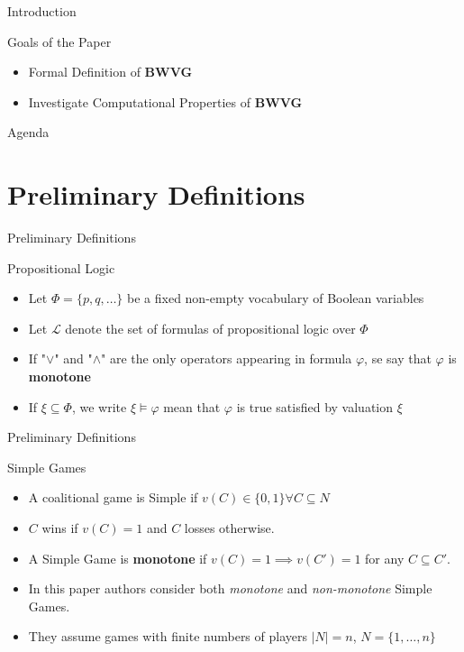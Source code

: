\documentclass{beamer}
\begin{document}
\begin{frame}[fragile]{Introduction}
  \begin{block}{Goals of the Paper}
    \begin{itemize}
      \item Formal Definition of \textbf{BWVG}
      \item Investigate Computational Properties of \textbf{BWVG}
    \end{itemize}
  \end{block}
\end{frame}

\begin{frame}[fragile]{Agenda}
  \section{Preliminary Definitions}
  \tableofcontents[currentsection]
\end{frame}

\begin{frame}[fragile]{Preliminary Definitions}
  \begin{block}{Propositional Logic}
    \begin{itemize}
      \item Let $\Phi = \{p,q,\dots\}$ be a fixed non-empty vocabulary of Boolean variables    
      \item Let $\mathcal{L}$ denote the set of formulas of propositional logic over $\Phi$
      \item If "$\lor$" and "$\land$" are the only operators appearing in formula $\varphi$, se say that $\varphi$ is \textbf{monotone}
      \item If $\xi \subseteq \Phi$, we write $\xi \models \varphi$ mean that $\varphi$ is true satisfied by valuation $\xi$
    \end{itemize}
  \end{block}
\end{frame}

\begin{frame}[fragile]{Preliminary Definitions}
  \begin{block}{Simple Games}
    \begin{itemize}
      \item A coalitional game is Simple if $v(C) \in \{0,1\} \forall C \subseteq N$
      \item $C$ wins if $v(C) = 1$ and $C$ losses otherwise.  
      \item A Simple Game is \textbf{monotone} if $v(C) = 1 \implies v(C') = 1$ for any $C \subseteq C'$.
      \item In this paper authors consider both \textit{monotone} and \textit{non-monotone} Simple Games.
      \item They assume games with finite numbers of players $|N| = n$, $N = \{1,\dots,n\}$
    \end{itemize}
  \end{block}
\end{frame}
\end{document}
